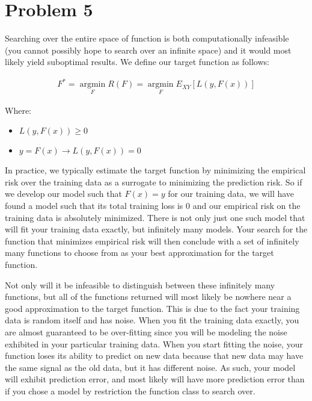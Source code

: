 \documentclass[11pt]{article}
\DeclareMathOperator*{\argmin}{argmin}
\newcommand*{\argminl}{\argmin\limits}
\begin{document}
\section*{Problem 5}

\vspace{5 mm} 
\noindent 
Searching over the entire space of function is both computationally infeasible 
(you cannot possibly hope to search over an infinite space) and it would most 
likely yield suboptimal results. We define our target function as follows:

\begin{gather*}
F^{*} = \argminl_{F} R(F) = \argminl_{F} E_{XY}[L(y, F(x))]
\end{gather*}

\noindent
Where:

\begin{itemize}
\item $L(y, F(x)) \ge 0$
\item $y = F(x) \rightarrow L(y, F(x)) = 0$
\end{itemize}

\noindent
In practice, we typically estimate the target function by minimizing the
empirical risk over the training data as a surrogate to minimizing the
prediction risk. So if we develop our model such that $F(x) = y$ for our
training data, we will have found a model such that its total training loss is
$0$ and our empirical risk on the training data is absolutely minimized. There 
is not only just one such model that will fit your training data exactly, but
infinitely many models. Your search for the function that minimizes empirical
risk will then conclude with a set of infinitely many functions to choose from
as your best approximation for the target function.

\vspace{5 mm}
\noindent
Not only will it be infeasible to distinguish between these infinitely many
functions, but all of the functions returned will most likely be nowhere near a
good approximation to the target function. This is due to the fact your training
data is random itself and has noise. When you fit the training data exactly, you
are almost guaranteed to be over-fitting since you will be modeling the noise
exhibited in your particular training data. When you start fitting the noise,
your function loses its ability to predict on new data because that new data may
have the same signal as the old data, but it has different noise. As such, your 
model will exhibit prediction error, and most likely will have more prediction 
error than if you chose a model by restriction the function class to search 
over.
\end{document}
